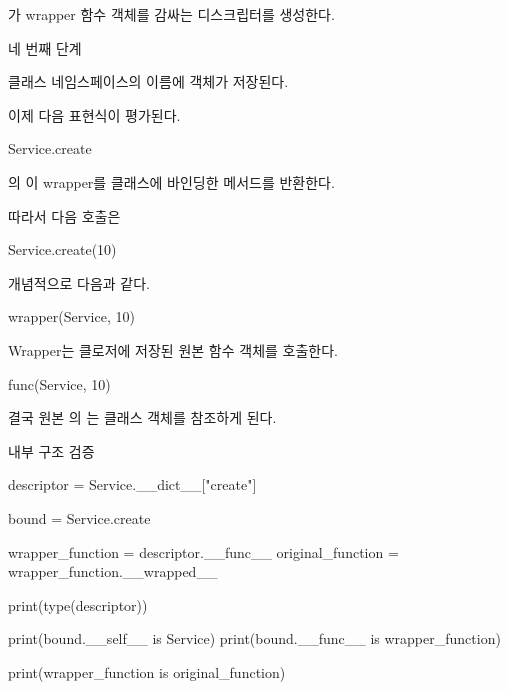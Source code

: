 가 wrapper 함수 객체를 감싸는 디스크립터를 생성한다.

\begin{dhknote}
\begin{dhksmry}[centered]
네 번째 단계
\end{dhksmry}
\end{dhknote}

클래스 네임스페이스의  이름에  객체가 저장된다.

이제 다음 표현식이 평가된다.

\begin{dhkcode}
Service.create
\end{dhkcode}

의 이 wrapper를  클래스에 바인딩한 메서드를 반환한다.

따라서 다음 호출은

\begin{dhkcode}
Service.create(10)
\end{dhkcode}

개념적으로 다음과 같다.

\begin{dhkcode}
wrapper(Service, 10)
\end{dhkcode}

Wrapper는 클로저에 저장된 원본 함수 객체를 호출한다.

\begin{dhkcode}
func(Service, 10)
\end{dhkcode}

결국 원본 의 는  클래스 객체를 참조하게 된다.

\begin{dhknote}
\begin{dhksmry}[centered]
내부 구조 검증
\end{dhksmry}
\end{dhknote}

\begin{dhkcode}
descriptor = Service.__dict__["create"]

bound = Service.create

wrapper_function = descriptor.__func__
original_function = wrapper_function.__wrapped__

print(type(descriptor))

print(bound.__self__ is Service)
print(bound.__func__ is wrapper_function)

print(wrapper_function is original_function)
\end{dhkcode}

